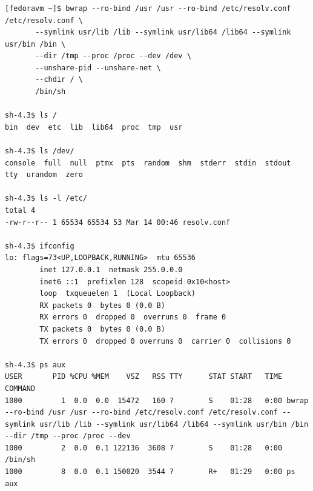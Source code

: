 \begin{frame}[fragile]
  \frametitle{\insertsubsection}
\begin{tiny}
\begin{verbatim}
[fedoravm ~]$ bwrap --ro-bind /usr /usr --ro-bind /etc/resolv.conf /etc/resolv.conf \
       --symlink usr/lib /lib --symlink usr/lib64 /lib64 --symlink usr/bin /bin \
       --dir /tmp --proc /proc --dev /dev \
       --unshare-pid --unshare-net \
       --chdir / \
       /bin/sh

sh-4.3$ ls /
bin  dev  etc  lib  lib64  proc  tmp  usr

sh-4.3$ ls /dev/
console  full  null  ptmx  pts	random	shm  stderr  stdin  stdout  tty  urandom  zero

sh-4.3$ ls -l /etc/
total 4
-rw-r--r-- 1 65534 65534 53 Mar 14 00:46 resolv.conf

sh-4.3$ ifconfig
lo: flags=73<UP,LOOPBACK,RUNNING>  mtu 65536
        inet 127.0.0.1  netmask 255.0.0.0
        inet6 ::1  prefixlen 128  scopeid 0x10<host>
        loop  txqueuelen 1  (Local Loopback)
        RX packets 0  bytes 0 (0.0 B)
        RX errors 0  dropped 0  overruns 0  frame 0
        TX packets 0  bytes 0 (0.0 B)
        TX errors 0  dropped 0 overruns 0  carrier 0  collisions 0

sh-4.3$ ps aux
USER       PID %CPU %MEM    VSZ   RSS TTY      STAT START   TIME COMMAND
1000         1  0.0  0.0  15472   160 ?        S    01:28   0:00 bwrap --ro-bind /usr /usr --ro-bind /etc/resolv.conf /etc/resolv.conf --symlink usr/lib /lib --symlink usr/lib64 /lib64 --symlink usr/bin /bin --dir /tmp --proc /proc --dev 
1000         2  0.0  0.1 122136  3608 ?        S    01:28   0:00 /bin/sh
1000         8  0.0  0.1 150020  3544 ?        R+   01:29   0:00 ps aux
\end{verbatim}
\end{tiny}
\end{frame}

